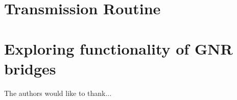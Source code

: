 \documentclass[aps, prb, a4paper, english, 12pt, onecolumn, longbibliography, amsmath, amssymb, colorinlistoftodos, floatfix, svgnames]{revtex4-2}
\numberwithin{equation}{subsection}
\begin{document}
\section{Transmission Routine}\label{transec}

\section{Exploring functionality of GNR bridges}

\newpage
\begin{acknowledgments}
	The authors would like to thank...
\end{acknowledgments}
\onecolumngrid


\newpage
\listoffigures
\listoftables
\listoflistings
\newpage

\end{document}
